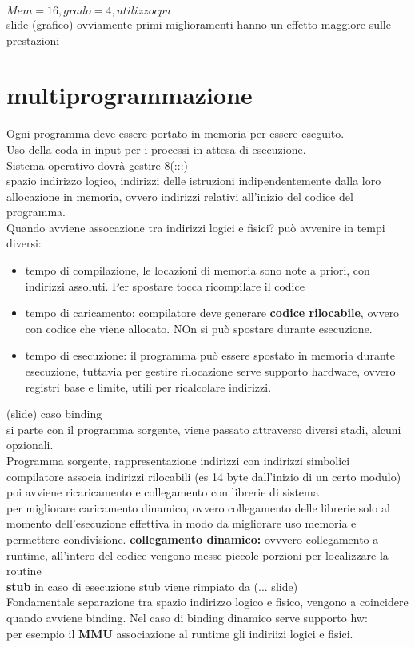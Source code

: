\documentclass{article}
\begin{document}
$Mem = 16, grado = 4, utilizzo cpu$\\
slide (grafico)  ovviamente primi miglioramenti hanno un effetto maggiore sulle prestazioni\\

\section{multiprogrammazione}
Ogni programma deve essere portato in memoria per essere eseguito.\\
Uso della coda in input per i processi in attesa di esecuzione.\\
Sistema operativo dovrà gestire 8(:::)\\
spazio indirizzo logico, indirizzi delle istruzioni indipendentemente dalla loro allocazione in memoria, ovvero indirizzi relativi all'inizio del codice del programma. \\
Quando avviene assocazione tra indirizzi logici e fisici? può avvenire in tempi diversi:
\begin{itemize}
    \item tempo di compilazione, le locazioni di memoria sono note a priori, con indirizzi assoluti. Per spostare tocca ricompilare il codice
    \item tempo di caricamento: compilatore deve generare \textbf{codice rilocabile}, ovvero con codice che viene allocato. NOn si può spostare durante esecuzione.
    \item tempo di esecuzione: il programma può essere spostato in memoria durante esecuzione, tuttavia per gestire rilocazione serve supporto hardware, ovvero registri base e limite, utili per ricalcolare indirizzi.
\end{itemize}
(slide)
caso binding\\
si parte con il programma sorgente, viene passato attraverso diversi stadi, alcuni opzionali.\\
Programma sorgente, rappresentazione indirizzi con indirizzi simbolici\\
compilatore associa indirizzi rilocabili (es 14 byte dall'inizio di un certo modulo)\\
poi avviene ricaricamento e collegamento con librerie di sistema\\
per migliorare caricamento dinamico, ovvero collegamento delle librerie solo al momento dell'esecuzione effettiva in modo da migliorare uso memoria e permettere condivisione.
\textbf{collegamento dinamico:} ovvvero collegamento a runtime, all'intero del codice vengono messe piccole porzioni per localizzare la routine\\
\textbf{stub} in caso di esecuzione stub viene rimpiato da (... slide)\\
Fondamentale separazione tra spazio indirizzo logico e fisico, vengono a coincidere quando avviene binding. Nel caso di binding dinamico serve supporto hw: \\
per esempio il \textbf{MMU} associazione al runtime gli indiriizi logici e fisici.\\
\end{document}
